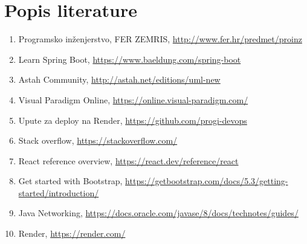 \chapter*{Popis literature}
	 	
	
		
		
		\begin{enumerate}
			
			
			\item  Programsko inženjerstvo, FER ZEMRIS, \url{http://www.fer.hr/predmet/proinz}
			
			\item  Learn Spring Boot, \url{https://www.baeldung.com/spring-boot}
			
			\item  Astah Community, \url{http://astah.net/editions/uml-new}
			
			\item  Visual Paradigm Online, \url{https://online.visual-paradigm.com/}
			
			\item  Upute za deploy na Render, \url{https://github.com/progi-devops}
			
			\item  Stack overflow, \url{https://stackoverflow.com/}
			
			\item  React reference overview, \url{https://react.dev/reference/react}
			
			\item  Get started with Bootstrap, \url{https://getbootstrap.com/docs/5.3/getting-started/introduction/}
			
			\item  Java Networking, \url{https://docs.oracle.com/javase/8/docs/technotes/guides/}
			
			\item  Render, \url{https://render.com/}
			
		\end{enumerate}
		
		 
